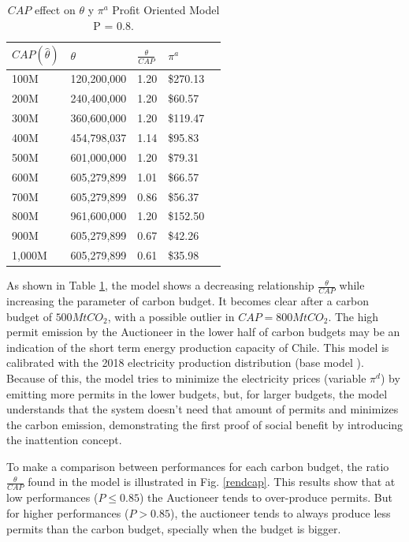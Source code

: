 \documentclass[a4paper,fleqn]{cas-dc}
\begin{document}
\begin{table}[H]
    \caption{{\footnotesize $CAP$ effect on $\theta$ y $\pi^a$ Profit Oriented Model P = 0.8.}}
    \label{efectocapthetapia}
    \centering
    \begin{tabular}{ l l l l l }
    \hline
         $CAP(\hat{\theta})$ & $\theta$  & $\frac{\theta}{CAP}$  & $\pi^a$  \\ \hline
         100M & 120,200,000 & 1.20 &  \$270.13   \\ \hline
       200M & 240,400,000 & 1.20 &  \$60.57   \\ \hline
        300M & 360,600,000 & 1.20 &  \$119.47   \\ \hline
        400M & 454,798,037 & 1.14 &  \$95.83   \\ \hline
        500M & 601,000,000 & 1.20 &  \$79.31   \\ \hline
        600M & 605,279,899 & 1.01 &  \$66.57   \\ \hline
        700M & 605,279,899 & 0.86 &  \$56.37   \\ \hline
        800M & 961,600,000 & 1.20 &  \$152.50   \\ \hline
        900M & 605,279,899 & 0.67 &  \$42.26   \\ \hline
        1,000M & 605,279,899 & 0.61 &  \$35.98   \\ \hline
    \end{tabular}
\end{table}

As shown in Table \ref{efectocapthetapia}, the model shows a decreasing relationship $\frac{\theta}{CAP}$ while increasing the parameter of carbon budget. It becomes clear after a carbon budget of $500MtCO_2$, with a possible outlier in $CAP=800MtCO_2$. The high permit emission by the Auctioneer in the lower half of carbon budgets may be an indication of the short term energy production capacity of Chile. This model is calibrated with the 2018 electricity production distribution (base model \cite{amigo_two_2021}). Because of this, the model tries to minimize the electricity prices (variable $\pi^d$) by emitting more permits in the lower budgets, but, for larger budgets, the model understands that the system doesn't need that amount of permits and minimizes the carbon emission, demonstrating the first proof of social benefit by introducing the inattention concept.

To make a comparison between performances for each carbon budget, the ratio $\frac{\theta}{CAP}$ found in the model is illustrated in Fig. \ref{rendcap}. This results show that at low performances ($P \leq 0.85$) the Auctioneer tends to over-produce permits. But for higher performances ($P > 0.85$), the auctioneer tends to always produce less permits than the carbon budget, specially when the budget is bigger.
\end{document}
